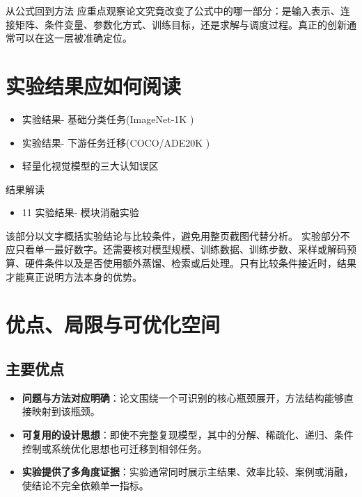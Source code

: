 \documentclass[UTF8,11pt,a4paper]{ctexart}
\newcommand{\term}[1]{\textbf{\textcolor{mainblue}{#1}}}
\begin{document}
\begin{keybox}{从公式回到方法}
应重点观察论文究竟改变了公式中的哪一部分：是输入表示、连接矩阵、条件变量、参数化方式、训练目标，还是求解与调度过程。真正的创新通常可以在这一层被准确定位。
\end{keybox}


\section{实验结果应如何阅读}
\begin{itemize}
\item 实验结果- 基础分类任务(ImageNet-1K )
\item 实验结果- 下游任务迁移(COCO/ADE20K )
\item 轻量化视觉模型的三大认知误区
\end{itemize}

\begin{notebox}{结果解读}
\begin{itemize}
\item 11 实验结果- 模块消融实验
\end{itemize}
\end{notebox}

该部分以文字概括实验结论与比较条件，避免用整页截图代替分析。
实验部分不应只看单一最好数字。还需要核对模型规模、训练数据、训练步数、采样或解码预算、硬件条件以及是否使用额外蒸馏、检索或后处理。只有比较条件接近时，结果才能真正说明方法本身的优势。

\section{优点、局限与可优化空间}
\subsection{主要优点}
\begin{itemize}
\item \term{问题与方法对应明确}：论文围绕一个可识别的核心瓶颈展开，方法结构能够直接映射到该瓶颈。
\item \term{可复用的设计思想}：即使不完整复现模型，其中的分解、稀疏化、递归、条件控制或系统优化思想也可迁移到相邻任务。
\item \term{实验提供了多角度证据}：实验通常同时展示主结果、效率比较、案例或消融，使结论不完全依赖单一指标。
\end{itemize}
\end{document}
